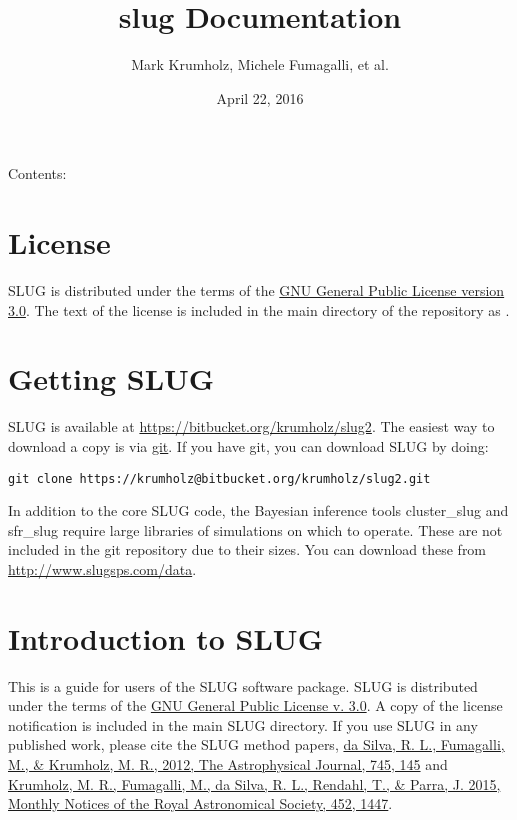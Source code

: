 \documentclass[letterpaper,10pt,english]{sphinxmanual}
\title{slug Documentation}
\date{April 22, 2016}
\author{Mark Krumholz, Michele Fumagalli, et al.}
\begin{document}
\maketitle
\tableofcontents
{}\label{index::doc}


Contents:


\chapter{License}
\label{license::doc}\label{license:welcome-to-slug-s-documentation}\label{license:license}
SLUG is distributed under the terms of the \href{http://www.gnu.org/copyleft/gpl.html}{GNU General Public License version 3.0}. The text of the license is included in the main directory of the repository as .


\chapter{Getting SLUG}
\label{getting:getting-slug}\label{getting::doc}
SLUG is available at \href{https://bitbucket.org/krumholz/slug2}{https://bitbucket.org/krumholz/slug2}. The easiest way to download a copy is via \href{http://git-scm.com/}{git}. If you have git, you can download SLUG by doing:

\begin{Verbatim}[commandchars=\\\{\}]
git clone https://krumholz@bitbucket.org/krumholz/slug2.git
\end{Verbatim}

In addition to the core SLUG code, the Bayesian inference tools cluster\_slug and sfr\_slug require large libraries of simulations on which to operate. These are not included in the git repository due to their sizes. You can download these from \href{http://www.slugsps.com/data}{http://www.slugsps.com/data}.


\chapter{Introduction to SLUG}
\label{intro:introduction-to-slug}\label{intro::doc}
This is a guide for users of the SLUG software package. SLUG is distributed under the terms of the \href{http://www.gnu.org/licenses/gpl.html}{GNU General Public License v. 3.0}. A copy of the license notification is included in the main SLUG directory. If you use SLUG in any published work, please cite the SLUG method papers, \href{http://adsabs.harvard.edu/abs/2012ApJ...745..145D}{da Silva, R. L., Fumagalli, M., \& Krumholz, M. R., 2012, The Astrophysical Journal, 745, 145} and \href{http://adsabs.harvard.edu/abs/2015MNRAS.452.1447K}{Krumholz, M. R., Fumagalli, M., da Silva, R. L., Rendahl, T., \& Parra, J. 2015, Monthly Notices of the Royal Astronomical Society, 452, 1447}.
\end{document}
